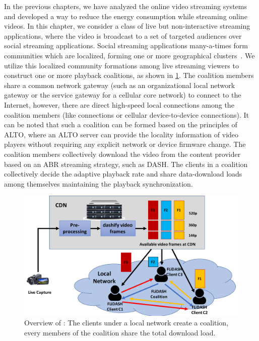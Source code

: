 In the previous chapters, we have analyzed the online video streaming systems and developed a way to reduce the energy consumption while streaming online videos. In this chapter, we consider a class of live but non-interactive streaming applications, where the video is broadcast to a set of targeted audiences over social streaming applications. Social streaming applications many-a-times form communities which are localized, forming one or more geographical clusters~\cite{wang2016anatomy}. We utilize this localized community formations among live streaming viewers to construct one or more playback coalitions, as shown in \fig\ref{fig:chap06:flsd}. The coalition members share a common network gateway (such as an organizational local network gateway or the service gateway for a cellular core network) to connect to the Internet, however, there are direct high-speed local connections among the coalition members (like  connections or cellular device-to-device connections). It can be noted that such a coalition can be formed based on the principles of \ac{ALTO}, where an \ac{ALTO} server can provide the locality information of video players without requiring any explicit network or device firmware change. The coalition members collectively download the video from the content provider based on an \ac{ABR} streaming strategy, such as \ac{DASH}. The clients in a coalition collectively decide the adaptive playback rate and share data-download loads among themselves maintaining the playback synchronization. 
\begin{figure}[!ht]
    \centering
    \includegraphics[width=0.8\linewidth]{img/flsd.pdf}
    \caption{Overview of \our: The clients under a local network create a coalition, every members of the coalition share the total download load.}
    \label{fig:chap06:flsd}
\end{figure}


